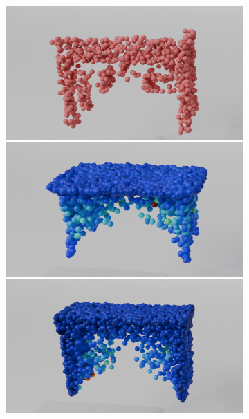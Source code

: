         \begin{figure}[htb]
          \centering
          \begin{subfigure}[t]{\textwidth+20pt\relax}
            \includegraphics[width=\dimexpr\linewidth-20pt\relax]{figures/part_t1.png}
            \includegraphics[width=\dimexpr\linewidth-20pt\relax]{figures/dc_lin_t1.png}
            \includegraphics[width=\dimexpr\linewidth-20pt\relax]{figures/do_lin_t1.png}

\end{subfigure}
\end{figure}
